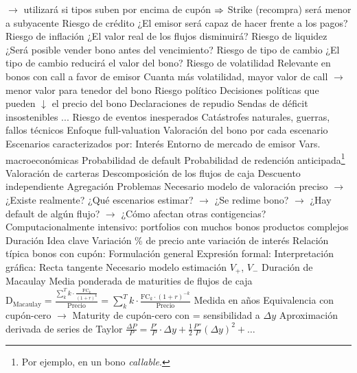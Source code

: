 \documentclass{nuevotema}
\begin{document}
\begin{esquemal}
				\4[] $\to$ utilizará si tipos suben por encima de cupón
				\4[] $\Rightarrow$ Strike (recompra) será menor a subyacente
			\3 Riesgo de crédito
				\4 ¿El emisor será capaz de hacer frente a los pagos?
			\3 Riesgo de inflación
				\4 ¿El valor real de los flujos disminuirá?
			\3 Riesgo de liquidez
				\4 ¿Será posible vender bono antes del vencimiento?
			\3 Riesgo de tipo de cambio
				\4 ¿El tipo de cambio reducirá el valor del bono?
			\3 Riesgo de volatilidad
				\4 Relevante en bonos con call a favor de emisor
				\4 Cuanta más volatilidad, mayor valor de call
				\4[] $\to$ menor valor para tenedor del bono
			\3 Riesgo político
				\4 Decisiones políticas que pueden $\downarrow$ el precio del bono
				\4[] Declaraciones de repudio
				\4[] Sendas de déficit insostenibles
				\4[] ...
			\3 Riesgo de eventos inesperados
				\4 Catástrofes naturales, guerras, fallos técnicos
		\2 Enfoque full-valuation
			\3 Valoración del bono por cada escenario
				\4 Escenarios caracterizados por:
				\4[] Interés
				\4[] Entorno de mercado de emisor
				\4[] Vars. macroeconómicas
				\4[] Probabilidad de default
				\4[] Probabilidad de redención anticipada\footnote{Por ejemplo, en un bono \textit{callable}.}
			\3 Valoración de carteras
				\4 Descomposición de los flujos de caja
				\4 Descuento independiente
				\4 Agregación
			\3 Problemas
				\4 Necesario modelo de valoración preciso
				\4[] $\to$ ¿Existe realmente?
				\4 ¿Qué escenarios estimar?
				\4[] $\to$ ¿Se redime bono?
				\4[] $\to$ ¿Hay default de algún flujo?
				\4[] $\to$ ¿Cómo afectan otras contigencias?
				\4 Computacionalmente intensivo:
				\4[] portfolios con muchos bonos
				\4[] productos complejos
		\2 Duración
			\3 Idea clave
				\4 Variación \% de precio ante variación de interés
				\4 Relación típica bonos con cupón:
				\4[] 
			\3 Formulación general
				\4 Expresión formal:
				\4[] 
				\4 Interpretación gráfica:
				\4[] Recta tangente
				\4[] 
				\4 Necesario modelo estimación $V_+$, $V_-$
			\3 Duración de Macaulay
				\4 Media ponderada de maturities de flujos de caja
				\4[] $\text{D}_\text{Macaulay} = \frac{\sum_k^T k \cdot \frac{\text{FC}_k}{(1+r)^k}}{\text{Precio}} = \sum_k^T k \cdot \frac{\text{FC}_k \cdot (1+r)^{-k}}{\text{Precio}} $
				\4 Medida en años
				\4[] Equivalencia con cupón-cero
				\4[] $\to$ Maturity de cupón-cero con = sensibilidad a $\Delta y$
				\4 Aproximación derivada de series de Taylor
				\4[] $\frac{\Delta P}{P} = \frac{P'}{P} \cdot \Delta y + \frac{1}{2} \frac{P''}{P} (\Delta y)^2 + \ldots$

\end{esquemal}
\end{document}
